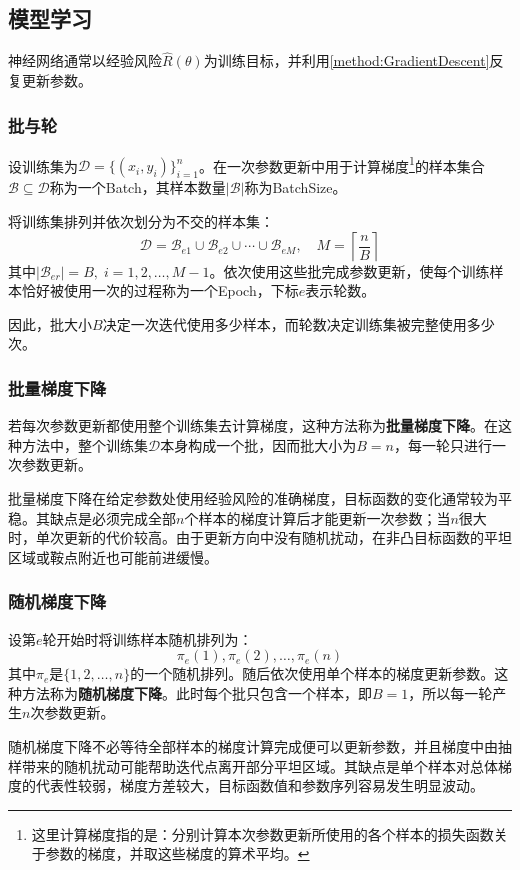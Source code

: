\subsection{模型学习}
神经网络通常以经验风险$\hat{R}(\theta)$为训练目标，并利用\cref{method:GradientDescent}反复更新参数。
\subsubsection{批与轮}
\begin{definition}
	设训练集为$\mathcal{D}=\{(x_i,y_i)\}_{i=1}^n$。在一次参数更新中用于计算梯度\footnote{这里计算梯度指的是：分别计算本次参数更新所使用的各个样本的损失函数关于参数的梯度，并取这些梯度的算术平均。}的样本集合$\mathcal{B}\subseteq\mathcal{D}$称为一个\gls{Batch}，其样本数量$|\mathcal{B}|$称为\gls{BatchSize}。
\end{definition}
\begin{definition}
	将训练集排列并依次划分为不交的样本集：
	\begin{equation*}
		\mathcal{D}=\mathcal{B}_{e1}\cup\mathcal{B}_{e2}\cup\cdots\cup\mathcal{B}_{eM},\quad M=\left\lceil\frac{n}{B}\right\rceil
	\end{equation*}
	其中$|\mathcal{B}_{er}|=B,\;i=1,2,\dots,M-1$。依次使用这些批完成参数更新，使每个训练样本恰好被使用一次的过程称为一个\gls{Epoch}，下标$e$表示轮数。
\end{definition}
因此，批大小$B$决定一次迭代使用多少样本，而轮数决定训练集被完整使用多少次。
\subsubsection{批量梯度下降}
若每次参数更新都使用整个训练集去计算梯度，这种方法称为\textbf{批量梯度下降}。在这种方法中，整个训练集$\mathcal{D}$本身构成一个批，因而批大小为$B=n$，每一轮只进行一次参数更新。\par
批量梯度下降在给定参数处使用经验风险的准确梯度，目标函数的变化通常较为平稳。其缺点是必须完成全部$n$个样本的梯度计算后才能更新一次参数；当$n$很大时，单次更新的代价较高。由于更新方向中没有随机扰动，在非凸目标函数的平坦区域或鞍点附近也可能前进缓慢。
\subsubsection{随机梯度下降}
设第$e$轮开始时将训练样本随机排列为：
\begin{equation*}
	\pi_e(1),\pi_e(2),\dots,\pi_e(n)
\end{equation*}
其中$\pi_e$是$\{1,2,\dots,n\}$的一个随机排列。随后依次使用单个样本的梯度更新参数。这种方法称为\textbf{随机梯度下降}。此时每个批只包含一个样本，即$B=1$，所以每一轮产生$n$次参数更新。\par
随机梯度下降不必等待全部样本的梯度计算完成便可以更新参数，并且梯度中由抽样带来的随机扰动可能帮助迭代点离开部分平坦区域。其缺点是单个样本对总体梯度的代表性较弱，梯度方差较大，目标函数值和参数序列容易发生明显波动。
